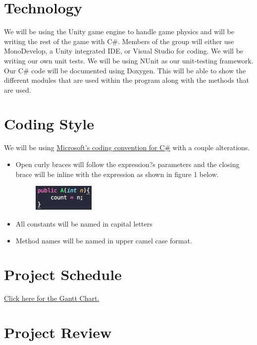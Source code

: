 \documentclass{article}
\begin{document}
\section{Technology}
We will be using the Unity game engine to handle game physics and will be writing the rest of the game with C\#.
Members of the group will either use MonoDevelop, a Unity integrated IDE, or Visual Studio for coding. We will be writing our own unit tests. We will be using NUnit as our unit-testing framework. Our C\# code will be documented using Doxygen. This will be able to show the different modules that are used within the program along with the methods that are used.

\section{Coding Style}
We will be using \href{https://msdn.microsoft.com/en-us/library/ff926074.aspx}{Microsoft's coding convention for C\#} with a couple alterations.
\begin{itemize}

\item Open curly braces will follow the expression?s parameters and the closing brace will be inline with the expression as shown in figure 1 below.

\begin{figure}[H]
\centering
  \includegraphics[width=30mm,scale = 0.25]{curlyBraces.jpg}
\end{figure}

  \item All constants will be named in capital letters

  \item Method names will be named in upper camel case format.

\end{itemize}

\section{Project Schedule}
\href{run:../../ProjectSchedule/ProjectSchedule.gan}{Click here for the Gantt Chart.}

\section{Project Review}
\end{document}

